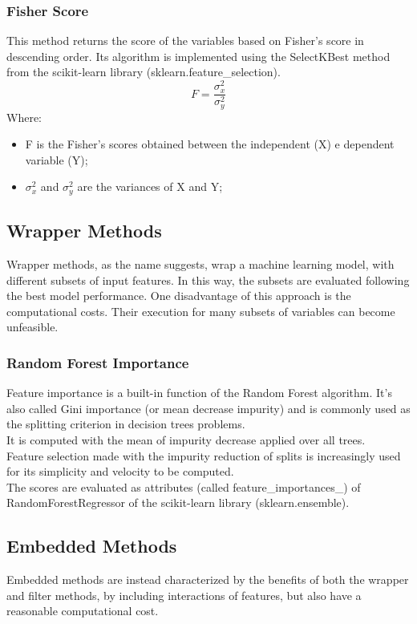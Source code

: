\subsubsection{Fisher Score}
This method returns the score of the variables based on Fisher’s score in descending order. \newline
Its algorithm is implemented using the SelectKBest method from the scikit-learn library (sklearn.feature\_selection).\newline
\begin{equation}
F = \frac{\sigma_x^2}{\sigma_y^2}
\end{equation}
Where:
\begin{itemize}
\item F is the Fisher's scores obtained between the independent (X) e dependent variable (Y);
    \item $\sigma_x^2$ and $\sigma_y^2$ are the variances of X and Y;
\end{itemize}
\bigbreak
\subsection{Wrapper Methods}
Wrapper methods, as the name suggests, wrap a machine learning model, with different subsets of input features. In this way, the subsets are evaluated following the best model performance.
One disadvantage of this approach is the computational costs.\newline
Their execution for many subsets of variables can become unfeasible. 
\subsubsection{Random Forest Importance}
Feature importance is a built-in function of the Random Forest algorithm. It's also called Gini importance (or mean decrease impurity) and is commonly used as the splitting criterion in decision trees problems. \\
It is computed with the mean of impurity decrease applied over all trees. \\ 
Feature selection made with the impurity reduction of splits is increasingly used for its simplicity and velocity to be computed.\\
The scores are evaluated as attributes (called feature\_importances\_) of RandomForestRegressor of the scikit-learn library \cite{sklearn} (sklearn.ensemble).
\bigbreak
\subsection{Embedded Methods}
Embedded methods are instead characterized by the benefits of both the wrapper and filter methods, by including interactions of features, but also have a reasonable computational cost.
